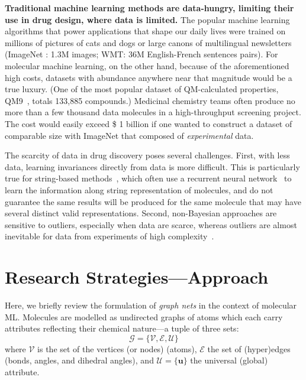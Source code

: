 \documentclass[11pt]{article}
\begin{document}
\noindent\textbf{Traditional machine learning methods are data-hungry, limiting their use in drug design, where data is limited.}
The popular machine learning algorithms that power applications that shape our daily lives were trained on millions of pictures of cats and dogs or large canons of multilingual newsletters (ImageNet \cite{imagenet_cvpr09}: 1.3M images; WMT\cite{wmt19}: 36M English-French sentences pairs). For molecular machine learning, on the other hand, because of the aforementioned high costs, datasets with abundance anywhere near that magnitude would be a true luxury. (One of the most popular dataset of QM-calculated properties, QM9~\cite{ramakrishnan2014quantum}, totals 133,885 compounds.) Medicinal chemistry teams often produce no more than a few thousand data molecules in a high-throughput screening project. The cost would easily exceed \$ 1 billion if one wanted to construct a dataset of comparable size with ImageNet that composed of \textit{experimental} data.

The scarcity of data in drug discovery poses several challenges. First, with less data, learning invariances directly from data is more difficult. This is particularly true for string-based methods~\cite{DBLP:journals/corr/Altae-TranRPP16}, which often use a recurrent neural network~\cite{DBLP:journals/corr/ChungGCB14, Hochreiter:1997:LSM:1246443.1246450} to learn the information along string representation of molecules, and do not guarantee the same results will be produced for the same molecule that may have several distinct valid representations. Second, non-Bayesian approaches are sensitive to outliers, especially when data are scarce, whereas outliers are almost inevitable for data from experiments of high complexity~\cite{pmid26201396}.\\

\section{Research Strategies---Approach}
Here, we briefly review the formulation of \textit{graph nets} in the context of molecular ML. Molecules are modelled as undirected graphs of atoms which each carry attributes reflecting their chemical nature---a tuple of three sets:\begin{equation}
\mathcal{G} = \{ \mathcal{V, E, U}\}
\end{equation}where $\mathcal{V}$ is the set of the vertices (or nodes) (atoms), $\mathcal{E}$ the set of (hyper)edges (bonds, angles, and dihedral angles), and $\mathcal{U} = \{ \mathbf{u}\}$ the universal (global) attribute. 
\end{document}
